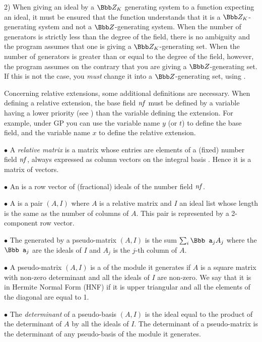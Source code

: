 2) When giving an ideal by a $\Z_K$ generating system to a function expecting
an ideal, it must be ensured that the function understands that it is a
$\Z_K$-generating system and not a $\Z$-generating system. When the number of
generators is strictly less than the degree of the field, there is no
ambiguity and the program assumes that one is giving a $\Z_K$-generating set.
When the number of generators is greater than or equal to the degree of the
field, however, the program assumes on the contrary that you are giving a
$\Z$-generating set. If this is not the case, you \emph{must} change it into
a $\Z$-generating set, using .

Concerning relative extensions, some additional definitions are necessary.
When defining a relative extension, the base field $\hbox{\it nf\/}$ must be defined
by a variable having a lower priority (see ) than the
variable defining the extension. For example, under GP you can use the
variable name $y$ (or $t$) to define the base field, and the variable name
$x$ to define the relative extension.

$\bullet$ A \emph{relative matrix} is a matrix whose entries are
elements of a (fixed) number field $\hbox{\it nf\/}$, always expressed as column
vectors on the integral basis . Hence it is a matrix of
vectors.

$\bullet$ An  is a row vector of (fractional)
ideals of the number field $\hbox{\it nf\/}$.

$\bullet$ A  is a pair $(A,I)$ where $A$ is a
relative matrix and $I$ an ideal list whose length is the same as the number
of columns of $A$. This pair is represented by a 2-component row vector.

$\bullet$ The  generated by a pseudo-matrix $(A,I)$ is
the sum $\sum_i {\Bbb a}_j A_j$ where the ${\Bbb a}_j$ are the ideals of $I$
and $A_j$ is the $j$-th column of $A$.

$\bullet$ A pseudo-matrix $(A,I)$ is a  of the module
it generates if $A$ is a square matrix with non-zero determinant and all the
ideals of $I$ are non-zero. We say that it is in Hermite Normal
Form (HNF) if it is upper triangular and all the
elements of the diagonal are equal to 1.

$\bullet$ The \emph{determinant} of a pseudo-basis $(A,I)$ is the ideal
equal to the product of the determinant of $A$ by all the ideals of $I$. The
determinant of a pseudo-matrix is the determinant of any pseudo-basis of the
module it generates.

